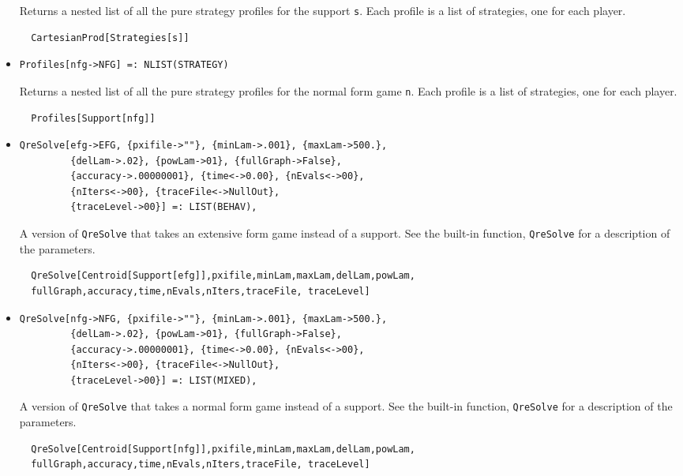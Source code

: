 \begin{itemize}
\bd 
Returns a nested list of all the pure strategy profiles for the support
\verb+s+.  Each profile is a list of strategies, one for each player.  
\begin{verbatim}
  CartesianProd[Strategies[s]]
\end{verbatim} 
\ed


\item{}
\protect \large \begin{verbatim}
Profiles[nfg->NFG] =: NLIST(STRATEGY) 
\end{verbatim}\normalsize

\bd 
Returns a nested list of all the pure strategy profiles for the normal
form game \verb+n+.  Each profile is a list of strategies, one for
each player.
\begin{verbatim}
  Profiles[Support[nfg]]
\end{verbatim} 
\ed


\item{}
\protect \large \begin{verbatim}
QreSolve[efg->EFG, {pxifile->""}, {minLam->.001}, {maxLam->500.}, 
         {delLam->.02}, {powLam->01}, {fullGraph->False}, 
         {accuracy->.00000001}, {time<->0.00}, {nEvals<->00}, 
         {nIters<->00}, {traceFile<->NullOut}, 
         {traceLevel->00}] =: LIST(BEHAV),
\end{verbatim}\normalsize

\bd 
A version of \verb+QreSolve+ that takes an extensive form
game instead of a support.  See the built-in function,
\verb+QreSolve+ for a description of the parameters.
\begin{verbatim}
  QreSolve[Centroid[Support[efg]],pxifile,minLam,maxLam,delLam,powLam, 
  fullGraph,accuracy,time,nEvals,nIters,traceFile, traceLevel]
\end{verbatim} 
\ed

\item{}
\protect \large \begin{verbatim}
QreSolve[nfg->NFG, {pxifile->""}, {minLam->.001}, {maxLam->500.}, 
         {delLam->.02}, {powLam->01}, {fullGraph->False}, 
         {accuracy->.00000001}, {time<->0.00}, {nEvals<->00}, 
         {nIters<->00}, {traceFile<->NullOut}, 
         {traceLevel->00}] =: LIST(MIXED),
\end{verbatim}\normalsize

\bd 
A version of \verb+QreSolve+ that takes a normal form
game instead of a support.  See the built-in function,
\verb+QreSolve+ for a description of the parameters.
\begin{verbatim}
  QreSolve[Centroid[Support[nfg]],pxifile,minLam,maxLam,delLam,powLam,
  fullGraph,accuracy,time,nEvals,nIters,traceFile, traceLevel]
\end{verbatim} 
\ed


\end{itemize}
